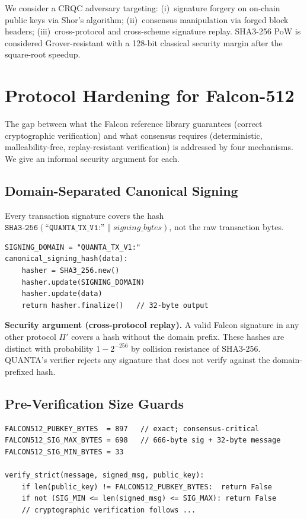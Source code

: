 \documentclass[11pt,a4paper]{article}
\begin{document}
We consider a CRQC adversary targeting: (i)~signature forgery on on-chain
public keys via Shor's algorithm; (ii)~consensus manipulation via forged
block headers; (iii)~cross-protocol and cross-scheme signature replay.
SHA3-256 PoW is considered Grover-resistant with a 128-bit classical
security margin after the square-root speedup.

\section{Protocol Hardening for Falcon-512}
\label{sec:hardening}

The gap between what the Falcon reference library guarantees (correct
cryptographic verification) and what consensus requires (deterministic,
malleability-free, replay-resistant verification) is addressed by four
mechanisms. We give an informal security argument for each.

\subsection{Domain-Separated Canonical Signing}

Every transaction signature covers the hash
$\texttt{SHA3-256}(\texttt{``QUANTA\_TX\_V1:''} \| \textit{signing\_bytes})$,
not the raw transaction bytes.

\begin{lstlisting}[caption={Canonical signing hash construction.}]
SIGNING_DOMAIN = "QUANTA_TX_V1:"
canonical_signing_hash(data):
    hasher = SHA3_256.new()
    hasher.update(SIGNING_DOMAIN)
    hasher.update(data)
    return hasher.finalize()   // 32-byte output
\end{lstlisting}

\textbf{Security argument (cross-protocol replay).}
A valid Falcon signature in any other protocol $\Pi'$ covers a hash without
the domain prefix. These hashes are distinct with probability $1-2^{-256}$
by collision resistance of SHA3-256. QUANTA's verifier rejects any signature
that does not verify against the domain-prefixed hash.

\subsection{Pre-Verification Size Guards}

\begin{lstlisting}[caption={Length bounds enforced before cryptographic verification.}]
FALCON512_PUBKEY_BYTES  = 897   // exact; consensus-critical
FALCON512_SIG_MAX_BYTES = 698   // 666-byte sig + 32-byte message
FALCON512_SIG_MIN_BYTES = 33

verify_strict(message, signed_msg, public_key):
    if len(public_key) != FALCON512_PUBKEY_BYTES:  return False
    if not (SIG_MIN <= len(signed_msg) <= SIG_MAX): return False
    // cryptographic verification follows ...
\end{lstlisting}
\end{document}
